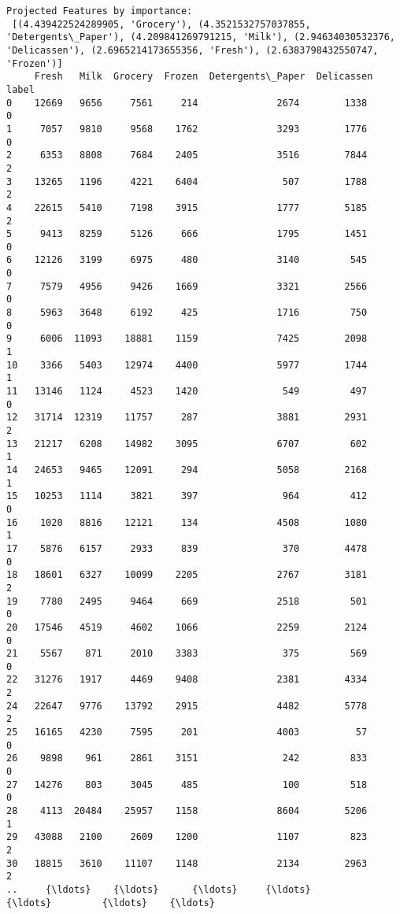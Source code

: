\documentclass[11pt]{article}
\begin{document}
    \begin{Verbatim}[commandchars=\\\{\}]
Projected Features by importance:
 [(4.439422524289905, 'Grocery'), (4.3521532757037855, 'Detergents\_Paper'), (4.209841269791215, 'Milk'), (2.94634030532376, 'Delicassen'), (2.6965214173655356, 'Fresh'), (2.6383798432550747, 'Frozen')]
     Fresh   Milk  Grocery  Frozen  Detergents\_Paper  Delicassen  label
0    12669   9656     7561     214              2674        1338      0
1     7057   9810     9568    1762              3293        1776      0
2     6353   8808     7684    2405              3516        7844      2
3    13265   1196     4221    6404               507        1788      2
4    22615   5410     7198    3915              1777        5185      2
5     9413   8259     5126     666              1795        1451      0
6    12126   3199     6975     480              3140         545      0
7     7579   4956     9426    1669              3321        2566      0
8     5963   3648     6192     425              1716         750      0
9     6006  11093    18881    1159              7425        2098      1
10    3366   5403    12974    4400              5977        1744      1
11   13146   1124     4523    1420               549         497      0
12   31714  12319    11757     287              3881        2931      2
13   21217   6208    14982    3095              6707         602      1
14   24653   9465    12091     294              5058        2168      1
15   10253   1114     3821     397               964         412      0
16    1020   8816    12121     134              4508        1080      1
17    5876   6157     2933     839               370        4478      0
18   18601   6327    10099    2205              2767        3181      2
19    7780   2495     9464     669              2518         501      0
20   17546   4519     4602    1066              2259        2124      0
21    5567    871     2010    3383               375         569      0
22   31276   1917     4469    9408              2381        4334      2
24   22647   9776    13792    2915              4482        5778      2
25   16165   4230     7595     201              4003          57      0
26    9898    961     2861    3151               242         833      0
27   14276    803     3045     485               100         518      0
28    4113  20484    25957    1158              8604        5206      1
29   43088   2100     2609    1200              1107         823      2
30   18815   3610    11107    1148              2134        2963      2
..     {\ldots}    {\ldots}      {\ldots}     {\ldots}               {\ldots}         {\ldots}    {\ldots}

\end{Verbatim}
\end{document}
